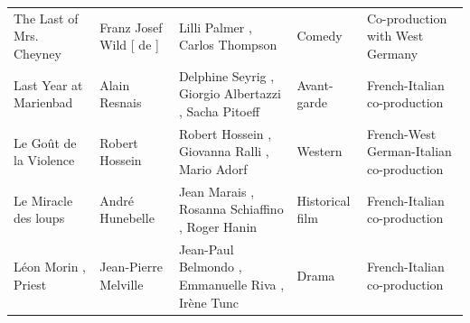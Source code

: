 \documentclass{article}
\begin{document}
\begin{tabular}{lllll}
The Last of Mrs. Cheyney & Franz Josef Wild [ de ] & Lilli Palmer , Carlos Thompson & Comedy & Co-production with West Germany \\
Last Year at Marienbad & Alain Resnais & Delphine Seyrig , Giorgio Albertazzi , Sacha Pitoeff & Avant-garde & French-Italian co-production \\
Le Goût de la Violence & Robert Hossein & Robert Hossein , Giovanna Ralli , Mario Adorf & Western & French-West German-Italian co-production \\
Le Miracle des loups & André Hunebelle & Jean Marais , Rosanna Schiaffino , Roger Hanin & Historical film & French-Italian co-production \\
Léon Morin , Priest & Jean-Pierre Melville & Jean-Paul Belmondo , Emmanuelle Riva , Irène Tunc & Drama & French-Italian co-production \\
\bottomrule
\end{tabular}
\end{document}
